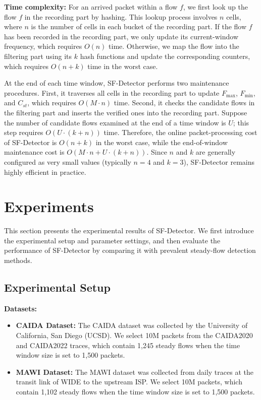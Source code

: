\documentclass[preprint,12pt]{elsarticle}
\begin{document}
\textbf{Time complexity:} For an arrived packet within a flow $f$, we first look up the flow $f$ in the recording part by hashing. This lookup process involves $n$ cells, where $n$ is the number of cells in each bucket of the recording part. If the flow $f$ has been recorded in the recording part, we only update its current-window frequency, which requires $O(n)$ time. Otherwise, we map the flow into the filtering part using its $k$ hash functions and update the corresponding counters, which requires $O(n + k)$ time in the worst case.

At the end of each time window, SF-Detector performs two maintenance procedures. First, it traverses all cells in the recording part to update $F_{\max}$, $F_{\min}$, and $C_{st}$, which requires $O(M \cdot n)$ time. Second, it checks the candidate flows in the filtering part and inserts the verified ones into the recording part. Suppose the number of candidate flows examined at the end of a time window is $U$; this step requires $O(U \cdot (k + n))$ time. Therefore, the online packet-processing cost of SF-Detector is $O(n + k)$ in the worst case, while the end-of-window maintenance cost is $O(M \cdot n + U \cdot (k + n))$. Since $n$ and $k$ are generally configured as very small values (typically $n = 4$ and $k = 3$), SF-Detector remains highly efficient in practice.

\section{Experiments}
This section presents the experimental results of SF-Detector. We first introduce the experimental setup and parameter settings, and then evaluate the performance of SF-Detector by comparing it with prevalent steady-flow detection methods.

\subsection{Experimental Setup}

\textbf{Datasets:}
\begin{itemize}
    \item \textbf{CAIDA Dataset:} The CAIDA dataset \cite{b30} was collected by the University of California, San Diego (UCSD). We select 10M packets from the CAIDA2020 and CAIDA2022 traces, which contain 1,245 steady flows when the time window size is set to 1,500 packets.
    \item \textbf{MAWI Dataset:} The MAWI dataset \cite{b31} was collected from daily traces at the transit link of WIDE to the upstream ISP. We select 10M packets, which contain 1,102 steady flows when the time window size is set to 1,500 packets.
\end{itemize}
\end{document}
